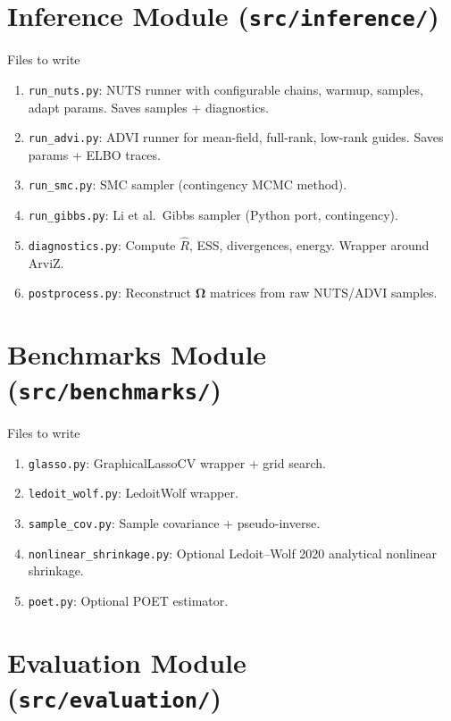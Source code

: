 \documentclass[11pt,a4paper]{article}
\newcommand{\bOmega}{\bm{\Omega}}
\begin{document}
\section{Inference Module (\texttt{src/inference/})}

\begin{code}{Files to write}
\begin{enumerate}[nosep]
  \item \texttt{run\_nuts.py}: NUTS runner with configurable chains, warmup, samples, adapt params. Saves samples + diagnostics.
  \item \texttt{run\_advi.py}: ADVI runner for mean-field, full-rank, low-rank guides. Saves params + ELBO traces.
  \item \texttt{run\_smc.py}: SMC sampler (contingency MCMC method).
  \item \texttt{run\_gibbs.py}: Li et al.\ Gibbs sampler (Python port, contingency).
  \item \texttt{diagnostics.py}: Compute $\hat{R}$, ESS, divergences, energy. Wrapper around ArviZ.
  \item \texttt{postprocess.py}: Reconstruct $\bOmega$ matrices from raw NUTS/ADVI samples.
\end{enumerate}
\end{code}

\section{Benchmarks Module (\texttt{src/benchmarks/})}

\begin{code}{Files to write}
\begin{enumerate}[nosep]
  \item \texttt{glasso.py}: GraphicalLassoCV wrapper + grid search.
  \item \texttt{ledoit\_wolf.py}: LedoitWolf wrapper.
  \item \texttt{sample\_cov.py}: Sample covariance + pseudo-inverse.
  \item \texttt{nonlinear\_shrinkage.py}: Optional Ledoit--Wolf 2020 analytical nonlinear shrinkage.
  \item \texttt{poet.py}: Optional POET estimator.
\end{enumerate}
\end{code}

\section{Evaluation Module (\texttt{src/evaluation/})}
\end{document}

